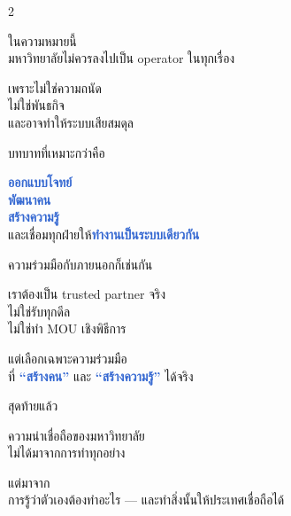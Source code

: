 \documentclass[10pt]{article}
\begin{document}
\begin{tcolorbox}[breakable,colback=panel,colframe=line,boxrule=0.5pt,arc=2mm,left=3mm,right=3mm,top=2mm,bottom=2mm]
\begin{multicols}{2}
\par ในความหมายนี้\\ มหาวิทยาลัยไม่ควรลงไปเป็น operator ในทุกเรื่อง
\par เพราะไม่ใช่ความถนัด\\ ไม่ใช่พันธกิจ\\ และอาจทำให้ระบบเสียสมดุล
\par บทบาทที่เหมาะกว่าคือ
\par \textbf{\textcolor{highlight}{ออกแบบโจทย์}}\\ \textbf{\textcolor{highlight}{พัฒนาคน}}\\ \textbf{\textcolor{highlight}{สร้างความรู้}}\\ และเชื่อมทุกฝ่ายให้\textbf{\textcolor{highlight}{ทำงานเป็นระบบเดียวกัน}}
\par ความร่วมมือกับภายนอกก็เช่นกัน
\par เราต้องเป็น trusted partner จริง\\ ไม่ใช่รับทุกดีล\\ ไม่ใช่ทำ MOU เชิงพิธีการ
\par แต่เลือกเฉพาะความร่วมมือ\\ ที่ \textbf{\textcolor{highlight}{“สร้างคน”}} และ \textbf{\textcolor{highlight}{“สร้างความรู้”}} ได้จริง
\par สุดท้ายแล้ว
\par ความน่าเชื่อถือของมหาวิทยาลัย\\ ไม่ได้มาจากการทำทุกอย่าง
\par แต่มาจาก\\ การรู้ว่าตัวเองต้องทำอะไร — และทำสิ่งนั้นให้ประเทศเชื่อถือได้
\end{multicols}
\end{tcolorbox}

\clearpage
\end{document}
